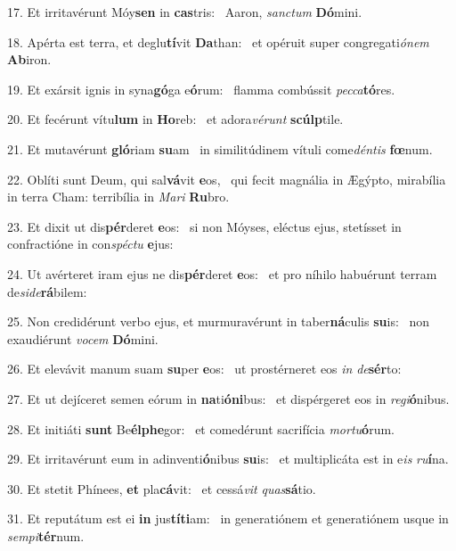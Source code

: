 17. Et irritavérunt Móy\textbf{sen} in \textbf{cas}tris: \ast\  Aaron, \textit{sanc}\textit{tum} \textbf{Dó}mini.\

18. Apérta est terra, et deglu\textbf{tí}vit \textbf{Da}than: \ast\  et opéruit super congregati\textit{ó}\textit{nem} \textbf{Ab}iron.\

19. Et exársit ignis in syna\textbf{gó}ga e\textbf{ó}rum: \ast\  flamma combússit \textit{pec}\textit{ca}\textbf{tó}res.\

20. Et fecérunt vítu\textbf{lum} in \textbf{Ho}reb: \ast\  et adora\textit{vé}\textit{runt} \textbf{scúlp}tile.\

21. Et mutavérunt \textbf{gló}riam \textbf{su}am \ast\  in similitúdinem vítuli come\textit{dén}\textit{tis} \textbf{fœ}num.\

22. Oblíti sunt Deum, qui sal\textbf{vá}vit \textbf{e}os, \ast\  qui fecit magnália in Ægýpto, mirabília in terra Cham: terribília in \textit{Ma}\textit{ri} \textbf{Ru}bro.\

23. Et dixit ut dis\textbf{pér}deret \textbf{e}os: \ast\  si non Móyses, eléctus ejus, stetísset in confractióne in con\textit{spéc}\textit{tu} \textbf{e}jus:\

24. Ut avérteret iram ejus ne dis\textbf{pér}deret \textbf{e}os: \ast\  et pro níhilo habuérunt terram de\textit{si}\textit{de}\textbf{rá}bilem:\

25. Non credidérunt verbo ejus, et murmuravérunt in taber\textbf{ná}culis \textbf{su}is: \ast\  non exaudiérunt \textit{vo}\textit{cem} \textbf{Dó}mini.\

26. Et elevávit manum suam \textbf{su}per \textbf{e}os: \ast\  ut prostérneret eos \textit{in} \textit{de}\textbf{sér}to:\

27. Et ut dejíceret semen eórum in \textbf{na}ti\textbf{ó}\textbf{ni}bus: \ast\  et dispérgeret eos in \textit{re}\textit{gi}\textbf{ó}nibus.\

28. Et initiáti \textbf{sunt} Be\textbf{él}\textbf{phe}gor: \ast\  et comedérunt sacrifícia \textit{mor}\textit{tu}\textbf{ó}rum.\

29. Et irritavérunt eum in adinventi\textbf{ó}nibus \textbf{su}is: \ast\  et multiplicáta est in e\textit{is} \textit{ru}\textbf{í}na.\

30. Et stetit Phínees, \textbf{et} pla\textbf{cá}vit: \ast\  et cessá\textit{vit} \textit{quas}\textbf{sá}tio.\

31. Et reputátum est ei \textbf{in} jus\textbf{tí}\textbf{ti}am: \ast\  in generatiónem et generatiónem usque in \textit{sem}\textit{pi}\textbf{tér}num.\

